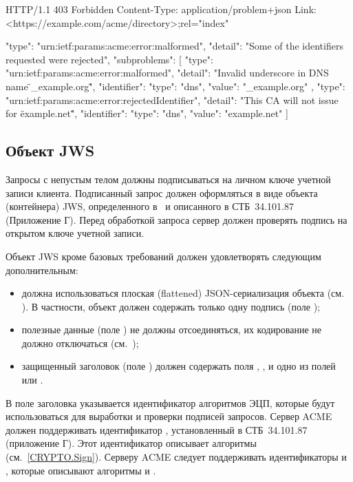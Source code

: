 \begin{codeblock}
HTTP/1.1 403 Forbidden
Content-Type: application/problem+json
Link: <https://example.com/acme/directory>;rel="index"

{
  "type": "urn:ietf:params:acme:error:malformed",
  "detail": "Some of the identifiers requested were rejected",
  "subproblems": [
    {
      "type": "urn:ietf:params:acme:error:malformed",
      "detail": "Invalid underscore in DNS name \"_example.org\"",
      "identifier": {
        "type": "dns",
        "value": "_example.org"
      }
    },
    {
      "type": "urn:ietf:params:acme:error:rejectedIdentifier",
      "detail": "This CA will not issue for \"example.net\"",
      "identifier": {
        "type": "dns",
        "value": "example.net"
      }
    }
  ]
}
\end{codeblock}
\fi

\subsection{Объект JWS}\label{ACME.Transport.JWS}

Запросы с непустым телом должны подписываться на личном ключе учетной записи
клиента. Подписанный запрос должен оформляться в виде объекта (контейнера)
JWS, определенного в~\cite{RFC7515} и описанного в СТБ~34.101.87 (Приложение Г).
%
Перед обработкой запроса сервер должен проверять подпись на открытом ключе 
учетной записи.

Объект JWS кроме базовых требований должен удовлетворять следующим 
дополнительным:

\begin{itemize}[label=--]
\item
должна использоваться плоская (flattened) JSON-сериализация объекта 
(см. \cite{RFC7515}). В частности, объект должен содержать только одну подпись 
(поле );
\item
полезные данные (поле ) не должны отсоединяться, их кодирование 
не должно отключаться (см.~\cite{RFC7797});
\item
защищенный заголовок (поле ) должен содержать поля , 
,  и одно из полей  или .
\end{itemize}

В поле  заголовка указывается идентификатор алгоритмов ЭЦП,
которые будут использоваться для выработки и проверки подписей запросов.
%
Сервер ACME должен поддерживать идентификатор , 
установленный в СТБ~34.101.87 (приложение Г). Этот идентификатор описывает
алгоритмы  (см.~\ref{CRYPTO.Sign}). Серверу ACME 
следует поддерживать идентификаторы  и , которые  
описывают алгоритмы  и .

